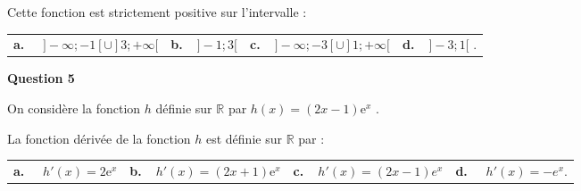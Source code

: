 \documentclass[10pt]{article}
\providecommand{\R}{\mathbb{R}}
\providecommand{\e}{{\mathrm{e}}}
\begin{document}
Cette fonction est strictement positive sur l'intervalle :

\begin{tabularx}{\linewidth}{*{4}{X}}
\textbf{a.~~} $] -\infty ; -1[\cup ]3; +\infty[$ &\textbf{b.~~}$] -1 ; 3[ $&\textbf{c.~~}$] - \infty; -3[ \cup  ]1; +\infty[$& \textbf{d.~~}$] - 3 ; 1[$ .
\end{tabularx}


\medskip
\textbf{Question 5}
\medskip 

On considère la fonction $h$ définie sur $\R$ par $h(x) = (2x -1)\e^x$ .

La fonction dérivée de la fonction $h$ est définie sur $\R$ par :

\begin{tabularx}{\linewidth}{*{4}{X}}
\textbf{a.~~} $h'(x) = 2\e^x$  &\textbf{b.~~}$h'(x) = (2x + 1)\e^x$ &\textbf{c.~~}$ h'(x) = (2x -1)e^x$& \textbf{d.~~} $h'(x) = -e^x$.
\end{tabularx}

\vspace{1cm}
\end{document}
